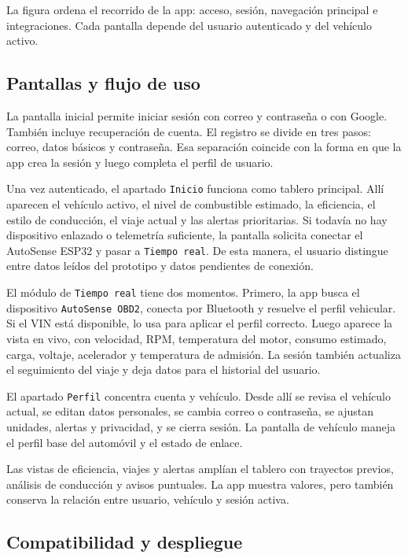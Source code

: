 \documentclass[12pt,letterpaper]{report}
\begin{document}
La figura ordena el recorrido de la app: acceso, sesión, navegación principal e integraciones. Cada pantalla depende del usuario autenticado y del vehículo activo.

\subsection{Pantallas y flujo de uso}

La pantalla inicial permite iniciar sesión con correo y contraseña o con Google. También incluye recuperación de cuenta. El registro se divide en tres pasos: correo, datos básicos y contraseña. Esa separación coincide con la forma en que la app crea la sesión y luego completa el perfil de usuario.

Una vez autenticado, el apartado \texttt{Inicio} funciona como tablero principal. Allí aparecen el vehículo activo, el nivel de combustible estimado, la eficiencia, el estilo de conducción, el viaje actual y las alertas prioritarias. Si todavía no hay dispositivo enlazado o telemetría suficiente, la pantalla solicita conectar el AutoSense ESP32 y pasar a \texttt{Tiempo real}. De esta manera, el usuario distingue entre datos leídos del prototipo y datos pendientes de conexión.

El módulo de \texttt{Tiempo real} tiene dos momentos. Primero, la app busca el dispositivo \texttt{AutoSense OBD2}, conecta por Bluetooth y resuelve el perfil vehicular. Si el VIN está disponible, lo usa para aplicar el perfil correcto. Luego aparece la vista en vivo, con velocidad, RPM, temperatura del motor, consumo estimado, carga, voltaje, acelerador y temperatura de admisión. La sesión también actualiza el seguimiento del viaje y deja datos para el historial del usuario.

El apartado \texttt{Perfil} concentra cuenta y vehículo. Desde allí se revisa el vehículo actual, se editan datos personales, se cambia correo o contraseña, se ajustan unidades, alertas y privacidad, y se cierra sesión. La pantalla de vehículo maneja el perfil base del automóvil y el estado de enlace.

Las vistas de eficiencia, viajes y alertas amplían el tablero con trayectos previos, análisis de conducción y avisos puntuales. La app muestra valores, pero también conserva la relación entre usuario, vehículo y sesión activa.

\subsection{Compatibilidad y despliegue}
\end{document}

